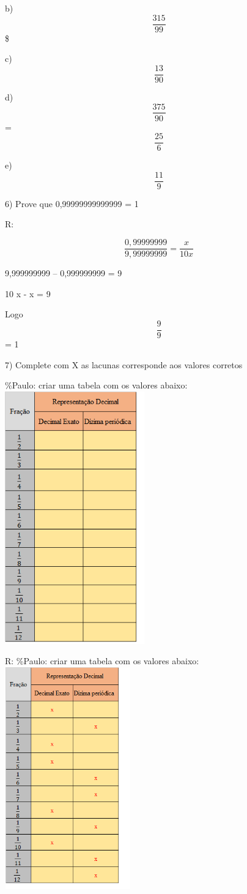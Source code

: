 b) \[\frac{315}{99}\]\$

c) \[\frac{13}{90}\]

d) \[\frac{375}{90}\] = \[\frac{25}{6}\]

e) \[\frac{11}{9}\]

6) Prove que 0,99999999999999 = 1

R:

\[\frac {0,99999999}{9,99999999} = \frac {x}{10x}\]

9,999999999 -- 0,999999999 = 9

10 x - x = 9

Logo \[\frac{9}{9}\] = 1

7) Complete com X as lacunas corresponde aos valores corretos

\%Paulo: criar uma tabela com os valores abaixo:
\includegraphics[width=2.37378in,height=4.29167in]{./imgSAEB_8_MAT/media/image3.png}

R: \%Paulo: criar uma tabela com os valores abaixo:
\includegraphics[width=2.14722in,height=3.775in]{./imgSAEB_8_MAT/media/image4.png}

